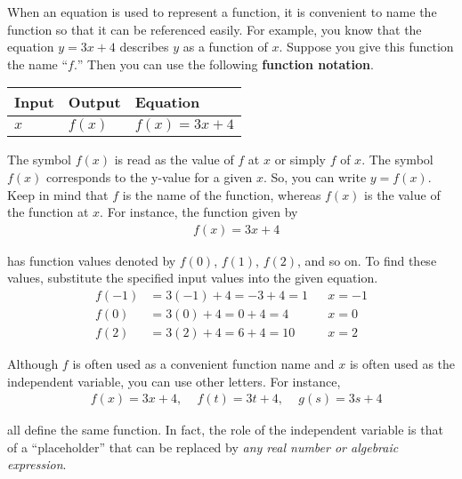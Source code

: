 When an equation is used to represent a function, it is convenient to name the function so that it can be referenced easily. For example, you know that the equation $y=3x+4$ describes $y$ as a function of $x$. Suppose you give this function the name “$f.$” Then you can use the following \textbf{function notation}. \cite{ci}

\begin{table}[h]
	\centering
	\begin{tabular}{l l l}
		\toprule
		\textbf{Input} & \textbf{Output} & \textbf{Equation} \\
		\midrule
		$x$   & $f(x)$    & $f(x) = 3x+4$ \\
		\bottomrule
	\end{tabular}
\end{table}

The symbol $f(x)$ is read as the value of $f$ at $x$ or simply $f$ of $x$. The symbol $f(x)$ corresponds to the y-value for a given $x$. So, you can write $y=f(x)$. Keep in mind that $f$ is the name of the function, whereas $f(x)$ is the value of the function at $x$. For instance, the function given by
\begin{align}
	  & f(x) = 3x+4 
\end{align}

has function values denoted by $f(0)$, $f(1)$, $f(2)$, and so on. To find these values, substitute the specified input values into the given equation.
\begin{align*}
	f(-1) & =3(-1)+4 = -3+4 = 1 &   & x=-1 \\
	f(0)  & =3(0)+4 = 0+4 = 4   &   & x=0  \\
	f(2)  & =3(2)+4 = 6+4 = 10  &   & x=2  
\end{align*}

Although $f$ is often used as a convenient function name and $x$ is often used as the independent variable, you can use other letters. For instance,
\begin{align}
	  & f(x)=3x+4\text{, }\quad f(t)=3t+4\text{, }\quad g(s)=3s+4 
\end{align}

all define the same function. In fact, the role of the independent variable is that of a “placeholder” that can be replaced by 
\textit{any real number or algebraic expression}. \cite{ci}

